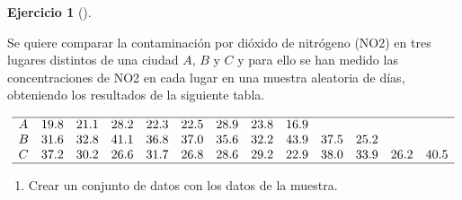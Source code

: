 \documentclass[
  a4paper,
]{scrreport}
\theoremstyle{definition}
\newtheorem{exercise}{Ejercicio}[chapter]
\theoremstyle{remark}
\begin{document}
\begin{exercise}[]\protect\hypertarget{exr-anova-un-factor-contaminacion}{}\label{exr-anova-un-factor-contaminacion}

Se quiere comparar la contaminación por dióxido de nitrógeno (NO2) en
tres lugares distintos de una ciudad \(A\), \(B\) y \(C\) y para ello se
han medido las concentraciones de NO2 en cada lugar en una muestra
aleatoria de días, obteniendo los resultados de la siguiente tabla.

\[
\begin{array}{lrrrrrrrrrrrr}
\hline
A & 19.8 & 21.1 & 28.2 & 22.3 & 22.5 & 28.9 & 23.8 & 16.9 \\
B & 31.6 & 32.8 & 41.1 & 36.8 & 37.0 & 35.6 & 32.2 & 43.9 & 37.5 & 25.2 \\
C & 37.2 & 30.2 & 26.6 & 31.7 & 26.8 & 28.6 & 29.2 & 22.9 & 38.0 & 33.9 & 26.2 & 40.5 \\
\hline
\end{array}
\]

\begin{enumerate}
\def\labelenumi{\alph{enumi}.}
\item
  Crear un conjunto de datos con los datos de la muestra.

  \begin{tcolorbox}[enhanced jigsaw, breakable, toptitle=1mm, colbacktitle=quarto-callout-tip-color!10!white, rightrule=.15mm, opacityback=0, opacitybacktitle=0.6, titlerule=0mm, coltitle=black, colframe=quarto-callout-tip-color-frame, colback=white, bottomtitle=1mm, leftrule=.75mm, toprule=.15mm, title=\textcolor{quarto-callout-tip-color}{\faLightbulb}\hspace{0.5em}{Solución}, arc=.35mm, bottomrule=.15mm, left=2mm]


\end{tcolorbox}
\end{enumerate}
\end{exercise}
\end{document}
